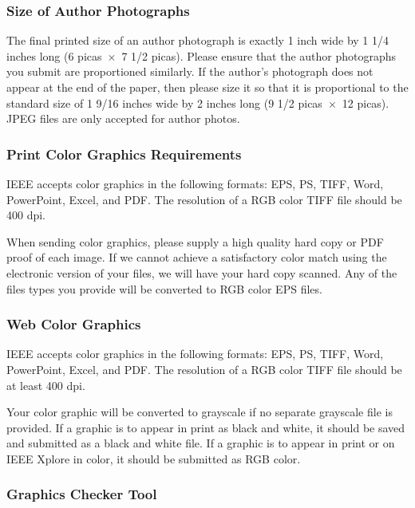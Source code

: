 \documentclass[transmag, onecolumn]{IEEEtran}
\begin{document}
\subsubsection*{Size of Author Photographs}

The final printed size of an author photograph is exactly 
1 inch wide by 1 1/4 inches long (6 picas~$\times$~7 1/2 picas). Please 
ensure that the author photographs you submit are proportioned similarly. If 
the author's photograph does not appear at the end of the paper, then please 
size it so that it is proportional to the standard size of 1 9/16 inches 
wide by 
2 inches long (9 1/2 picas~$\times$~12 picas). JPEG files are only 
accepted for author photos.

\subsubsection*{Print Color Graphics Requirements}

IEEE accepts color graphics in the following formats: EPS, PS, TIFF, Word, 
PowerPoint, Excel, and PDF. The resolution of a RGB color TIFF file should 
be 400 dpi. 

When sending color graphics, please supply a high quality hard copy or PDF 
proof of each image. If we cannot achieve a satisfactory color match using 
the electronic version of your files, we will have your hard copy scanned. 
Any of the files types you provide will be converted to RGB color EPS files. 

\subsubsection*{Web Color Graphics}

IEEE accepts color graphics in the following formats: EPS, PS, TIFF, Word, 
PowerPoint, Excel, and PDF. The resolution of a RGB color TIFF file should 
be at least 400 dpi. 

Your color graphic will be converted to grayscale if no separate grayscale 
file is provided. If a graphic is to appear in print as black and white, it 
should be saved and submitted as a black and white file. If a graphic is to 
appear in print or on IEEE Xplore in color, it should be submitted as RGB 
color. 

\subsubsection*{Graphics Checker Tool}
\end{document}
